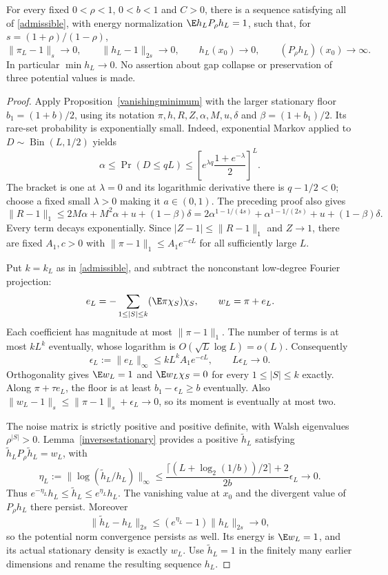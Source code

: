 \begin{proposition}\label{exactvanishingminimum}
For every fixed $0<\rho<1$, $0<b<1$ and $C>0$, there is a sequence
satisfying all of \eqref{admissible}, with energy normalization
$\E h_LP_\rho h_L=1$, such that, for $s=(1+\rho)/(1-\rho)$,
\[
 \|\pi_L-1\|_s\to0,\qquad \|h_L-1\|_{2s}\to0,\qquad
 h_L(x_0)\to0,\qquad (P_\rho h_L)(x_0)\to\infty.
\]
In particular $\min h_L\to0$. No assertion about gap collapse or
preservation of three potential values is made.
\end{proposition}
\begin{proof}
Apply Proposition~\ref{vanishingminimum} with the larger stationary
floor $b_1=(1+b)/2$, using its notation $\pi,h,R,Z,\alpha,M,u,\delta$
and $\beta=(1+b_1)/2$.
Its rare-set probability is exponentially small. Indeed, exponential
Markov applied to $D\sim\operatorname{Bin}(L,1/2)$ yields
\[
 \alpha\leq\Pr(D\leq qL)
 \leq\left[e^{\lambda q}\frac{1+e^{-\lambda}}2\right]^L.
\]
The bracket is one at $\lambda=0$ and its logarithmic derivative there
is $q-1/2<0$; choose a fixed small $\lambda>0$ making it $a\in(0,1)$.
The preceding proof also gives
\[
 \|R-1\|_1\leq2M\alpha+M^2\alpha+u+(1-\beta)\delta
 =2\alpha^{1-1/(4s)}+\alpha^{1-1/(2s)}+u+(1-\beta)\delta.
\]
Every term decays exponentially. Since $|Z-1|\leq\|R-1\|_1$ and
$Z\to1$, there are fixed $A_1,c>0$ with
$\|\pi-1\|_1\leq A_1e^{-cL}$ for all sufficiently large $L$.

Put $k=k_L$ as in \eqref{admissible}, and subtract the nonconstant
low-degree Fourier projection:
\[
 e_L=-\sum_{1\leq|S|\leq k}(\E\pi\chi_S)\chi_S,\qquad
 w_L=\pi+e_L.
\]
Each coefficient has magnitude at most $\|\pi-1\|_1$. The number of
terms is at most $kL^k$ eventually, whose logarithm is
$O(\sqrt L\log L)=o(L)$. Consequently
\[
 \epsilon_L:=\|e_L\|_\infty\leq kL^k A_1e^{-cL},\qquad
 L\epsilon_L\to0.
\]
Orthogonality gives $\E w_L=1$ and $\E w_L\chi_S=0$ for every
$1\leq|S|\leq k$ exactly. Along $\pi+\tau e_L$, the floor is at
least $b_1-\epsilon_L\geq b$ eventually. Also
$\|w_L-1\|_s\leq\|\pi-1\|_s+\epsilon_L\to0$, so its moment
is eventually at most two.

The noise matrix is strictly positive and positive definite, with
Walsh eigenvalues $\rho^{|S|}>0$. Lemma~\ref{inversestationary}
provides a positive $\widetilde h_L$ satisfying
$\widetilde h_L P_\rho\widetilde h_L=w_L$, with
\[
 \eta_L:=\|\log(\widetilde h_L/h_L)\|_\infty
 \leq\frac{\lceil (L+\log_2(1/b))/2\rceil+2}{2b}\epsilon_L\to0.
\]
Thus $e^{-\eta_L}h_L\leq\widetilde h_L\leq e^{\eta_L}h_L$.
The vanishing value at $x_0$ and the divergent value of $P_\rho h_L$
there persist. Moreover
\[
 \|\widetilde h_L-h_L\|_{2s}
 \leq(e^{\eta_L}-1)\|h_L\|_{2s}\to0,
\]
so the potential norm convergence persists as well. Its energy is
$\E w_L=1$, and its actual stationary density is exactly $w_L$.
Use $\widetilde h_L=1$ in the finitely many earlier dimensions and
rename the resulting sequence $h_L$.
\end{proof}
